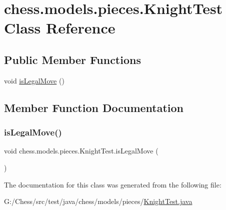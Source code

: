 \hypertarget{classchess_1_1models_1_1pieces_1_1_knight_test}{}\section{chess.\+models.\+pieces.\+Knight\+Test Class Reference}
\label{classchess_1_1models_1_1pieces_1_1_knight_test}
\subsection*{Public Member Functions}
\begin{DoxyCompactItemize}
\item 
void \mbox{\hyperlink{classchess_1_1models_1_1pieces_1_1_knight_test_a9d4b9c5b54db6a2cb8e161ac8bcf35eb}{is\+Legal\+Move}} ()
\end{DoxyCompactItemize}


\subsection{Member Function Documentation}
\mbox{\label{classchess_1_1models_1_1pieces_1_1_knight_test_a9d4b9c5b54db6a2cb8e161ac8bcf35eb}} 
\subsubsection{\texorpdfstring{is\+Legal\+Move()}{isLegalMove()}}
{\footnotesize\ttfamily void chess.\+models.\+pieces.\+Knight\+Test.\+is\+Legal\+Move (\begin{DoxyParamCaption}{ }\end{DoxyParamCaption})}



The documentation for this class was generated from the following file\+:\begin{DoxyCompactItemize}
\item 
G\+:/\+Chess/src/test/java/chess/models/pieces/\mbox{\hyperlink{_knight_test_8java}{Knight\+Test.\+java}}\end{DoxyCompactItemize}

